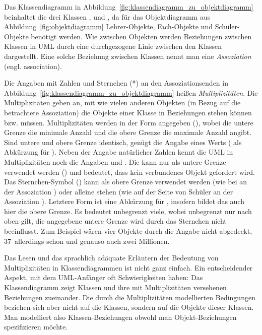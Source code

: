 \vspace{1.4mm} %

Das Klassendiagramm in Abbildung~\ref{fig:klassendiagramm_zu_objektdiagramm} beinhaltet die drei Klassen ,  und , da für das Objektdiagramm aus Abbildung~\ref{fig:objektdiagramm} Lehrer-Objekte, Fach-Objekte und Schüler-Objekte benötigt werden. Wie zwischen Objekten werden Beziehungen zwischen Klassen in UML durch eine durchgezogene Linie zwischen den Klassen dargestellt. Eine solche Beziehung zwischen Klassen nennt man eine \textit{\mbox{Assoziation}}
(engl. association). 

\vspace{1.4mm} %

Die Angaben mit Zahlen und Sternchen (*) an den Assoziationsenden in Abbildung~\ref{fig:klassendiagramm_zu_objektdiagramm} heißen \textit{Multiplizitäten}.
Die Multiplizitäten geben an, mit wie vielen anderen Objekten (in Bezug auf die betrachtete Assoziation) die Objekte einer Klasse in Beziehungen stehen können bzw. müssen. Multiplizitäten werden in der Form  angegeben (\zb {}), wobei die untere Grenze die minimale Anzahl und die obere Grenze die maximale Anzahl angibt. Sind untere und obere Grenze identisch, genügt die Angabe eines Werts (\zb {} als Abkürzung für ). Neben der Angabe natürlicher Zahlen kennt die UML in Multiplizitäten noch die Angaben  und \sttpUMLText{*}. Die  kann nur als untere Grenze verwendet werden (\zb {}) und bedeutet, dass kein verbundenes Objekt gefordert wird. Das Sternchen-Symbol (\sttpUMLText{*}) kann als obere Grenze verwendet werden (wie bei  an der Assoziation ) oder alleine stehen (wie auf der Seite von Schüler an der Assoziation ). Letztere Form ist eine Abkürzung für , insofern bildet das \sttpUMLText{*} auch hier die obere Grenze. Es bedeutet unbegrenzt viele, wobei unbegrenzt nur nach oben gilt, die angegebene untere Grenze wird durch das Sternchen nicht beeinflusst. Zum Beispiel wären vier Objekte durch die Angabe  nicht abgedeckt, 37~allerdings schon und genauso auch zwei Millionen. 

\vspace{1.4mm} %

Das Lesen
und das sprachlich adäquate Erläutern der Bedeutung von Multiplizitäten in Klassendiagrammen ist nicht ganz einfach. Ein entscheidender Aspekt, mit dem UML-Anfänger oft Schwierigkeiten haben: Das Klassendiagramm zeigt Klassen und ihre mit Multiplizitäten versehenen Beziehungen zueinander. Die durch die Multiplizitäten modellierten Bedingungen beziehen sich aber nicht auf die Klassen, sondern auf die Objekte dieser Klassen. Man modelliert also Klassen-Beziehungen obwohl man Objekt-Beziehungen spezifizieren möchte.

